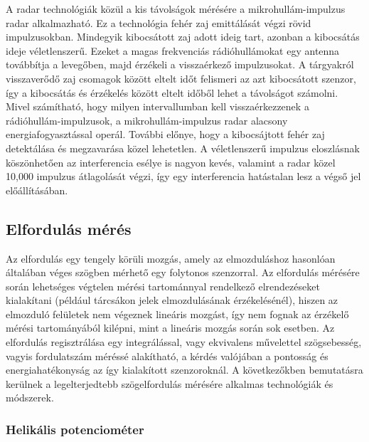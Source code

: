A radar technológiák közül a kis távolságok mérésére a mikrohullám-impulzus radar alkalmazható. Ez a technológia fehér zaj emittálását végzi rövid impulzusokban. Mindegyik kibocsátott zaj adott ideig tart, azonban a kibocsátás ideje véletlenszerű. Ezeket a magas frekvenciás rádióhullámokat egy antenna továbbítja a levegőben, majd érzékeli a visszaérkező impulzusokat. A tárgyakról visszaverődő zaj csomagok között eltelt időt felismeri az azt kibocsátott szenzor, így a kibocsátás és érzékelés között eltelt időből lehet a távolságot számolni. Mivel számítható, hogy milyen intervallumban kell visszaérkezzenek a rádióhullám-impulzusok, a mikrohullám-impulzus radar alacsony energiafogyasztással operál. További előnye, hogy a kibocsájtott fehér zaj detektálása és megzavarása közel lehetetlen. A véletlenszerű impulzus eloszlásnak köszönhetően az interferencia esélye is nagyon kevés, valamint a radar közel 10,000 impulzus átlagolását végzi, így egy interferencia hatástalan lesz a végső jel előállításában.

\subsection{Elfordulás mérés}
\label{elford}

Az elfordulás egy tengely körüli mozgás, amely az elmozduláshoz hasonlóan általában véges szögben mérhető egy folytonos szenzorral. Az elfordulás mérésére során lehetséges végtelen mérési tartománnyal rendelkező elrendezéseket kialakítani (például tárcsákon jelek elmozdulásának érzékelésénél), hiszen az elmozduló felületek nem végeznek lineáris mozgást, így nem fognak az érzékelő mérési tartományából kilépni, mint a lineáris mozgás során sok esetben. Az elfordulás regisztrálása egy integrálással, vagy ekvivalens művelettel szögsebesség, vagyis fordulatszám méréssé alakítható, a kérdés valójában a pontosság és energiahatékonyság az így kialakított szenzoroknál. A következőkben bemutatásra kerülnek a legelterjedtebb szögelfordulás mérésére alkalmas technológiák és módszerek.

\subsubsection{Helikális potenciométer}

